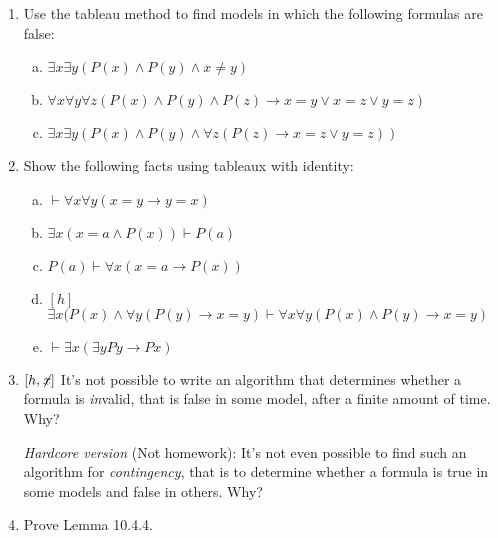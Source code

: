 \begin{enumerate}[\thesection.1]
			\item Use the tableau method to find models in which the following formulas are false:
			
			\begin{enumerate}[(a)]
			
				\item $\exists x\exists y(P(x)\land P(y)\land x\neq y)$
				
				\item $\forall x\forall y\forall z(P(x)\land P(y)\land P(z)\to x=y\lor x=z\lor y=z)$
				
				\item $\exists x\exists y(P(x)\land P(y)\land \forall z(P(z)\to x=z\lor y=z))$
			
			\end{enumerate}

			\item Show the following facts using tableaux with identity:
			
			\begin{enumerate}[(a)]
						
				\item $\vdash \forall x\forall y(x=y\to y=x)$
						
				\item $\exists x(x=a\land P(x))\vdash P(a)$
				
				\item $P(a)\vdash \forall x(x=a\to P(x))$

				\item $[h]$ $\exists x(P(x)\land \forall y(P(y)\to x=y)\vdash \forall x\forall y(P(x)\land P(y)\to x=y)$
				
				\item $\vdash \exists x(\exists yPy\to Px)$
							
			\end{enumerate}
			
			\item $[h, \not\hspace{-.5ex}x]$ It's not possible to write an algorithm that determines whether a formula is \emph{in}valid, that is false in some model, after a finite amount of time. Why? 
			
			\emph{Hardcore version} (Not homework): It's not even possible to find such an algorithm for \emph{contingency}, that is to determine whether a formula is true in some models and false in others. Why?
			
			\item Prove Lemma 10.4.4.
	
	\end{enumerate}

	
